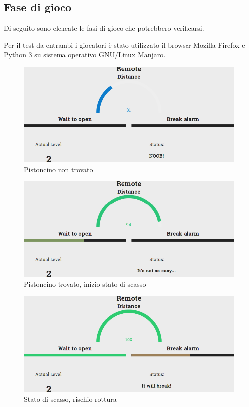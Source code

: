 \clearpage
\subsection{Fase di gioco}
Di seguito sono elencate le fasi di gioco che potrebbero verificarsi.

Per il test da entrambi i giocatori è stato utilizzato il browser Mozilla Firefox e Python 3 su sistema operativo GNU/Linux \href{https://manjaro.github.io/}{Manjaro}.

\begin{figure}[!ht]
	\centering
	\includegraphics[scale=.4]{img/testing/game1.png}
	\caption{Pistoncino non trovato}
\end{figure}

\begin{figure}[!ht]
	\centering
	\includegraphics[scale=.4]{img/testing/game2.png}
	\caption{Pistoncino trovato, inizio stato di scasso}
\end{figure}

\begin{figure}[!ht]
	\centering
	\includegraphics[scale=.4]{img/testing/game3.png}
	\caption{Stato di scasso, rischio rottura}
\end{figure}


